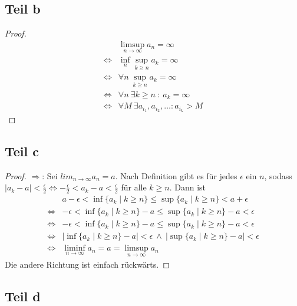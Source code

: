 \documentclass[10pt,a4paper]{article}
\begin{document}
\subsection{Teil b}
\begin{proof}
  \begin{align*}
    & \limsup_{n \rightarrow \infty} a_{n} = \infty\\
    \Leftrightarrow & \inf_{n} \sup_{k \ge n} a_{k} = \infty\\
    \Leftrightarrow & \forall n\ \sup_{k \ge n} a_{k} = \infty\\
    \Leftrightarrow & \forall n\ \exists k \ge n\ :\ a_{k} = \infty\\
    \Leftrightarrow & \forall M\ \exists a_{i_{1}}, a_{i_{2}}, \dots : a_{i_{k}} > M
  \end{align*}  
\end{proof}

\subsection{Teil c}
\begin{proof}
  $\Rightarrow$: Sei $lim_{n \rightarrow \infty} a_{n} = a$.
  Nach Definition gibt es für jedes $\epsilon$ ein $n$, sodass $|a_{k} - a| < \frac{\epsilon}{2} \Leftrightarrow -\frac{\epsilon}{2} < a_{k} - a < \frac{\epsilon}{2}$ für alle $k \ge n$.
  Dann ist
  \begin{align*}
    & a - \epsilon < \inf \{ a_{k} \mid k \ge n \} \le \sup \{ a_{k} \mid k \ge n \} < a + \epsilon\\
    \Leftrightarrow & -\epsilon < \inf \{ a_{k} \mid k \ge n \} - a \le \sup \{ a_{k} \mid k \ge n \} - a < \epsilon\\
    \Leftrightarrow & -\epsilon < \inf \{ a_{k} \mid k \ge n \} - a \le \sup \{ a_{k} \mid k \ge n \} - a < \epsilon\\
    \Leftrightarrow & |\inf \{ a_{k} \mid k \ge n \} - a| < \epsilon\ \land\ |\sup \{ a_{k} \mid k \ge n \} - a| < \epsilon\\
    \Leftrightarrow & \liminf_{n \rightarrow \infty} a_{n} = a = \limsup_{n \rightarrow \infty} a_{n}
  \end{align*}
  Die andere Richtung ist einfach rückwärts.
\end{proof}

\subsection{Teil d}
\end{document}
